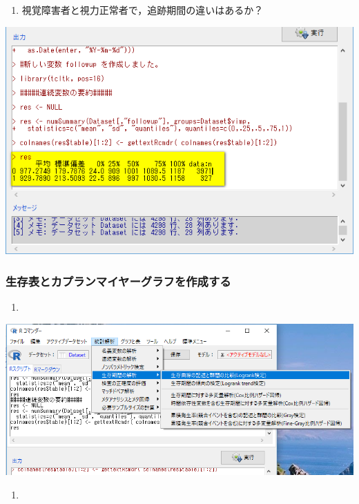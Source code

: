 \documentclass[11pt,]{problemset}
\providecommand{\tightlist}{%
  \setlength{\itemsep}{0pt}\setlength{\parskip}{0pt}}
\begin{document}
\begin{enumerate}
\def\labelenumi{\arabic{enumi}.}
\setcounter{enumi}{9}
\tightlist
\item
  視覚障害者と視力正常者で，追跡期間の違いはあるか？
\end{enumerate}

\begin{center}\includegraphics[width=0.55\linewidth,height=0.35\textheight]{pic/survival0903} \end{center}

\subsubsection{生存表とカプランマイヤーグラフを作成する}

\begin{enumerate}
\def\labelenumi{\arabic{enumi}.}
\item
\end{enumerate}

\begin{center}\includegraphics[width=0.7\linewidth,height=0.35\textheight]{pic/survival07} \end{center}

\begin{enumerate}
\def\labelenumi{\arabic{enumi}.}
\setcounter{enumi}{1}
\item
\end{enumerate}
\end{document}
